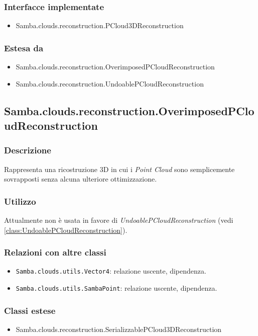 \subsubsection{Interfacce implementate}
\begin{itemize}
	\item Samba.clouds.reconstruction.PCloud3DReconstruction
\end{itemize}
\subsubsection{Estesa da}
\begin{itemize}
	\item Samba.clouds.reconstruction.OverimposedPCloudReconstruction
	\item Samba.clouds.reconstruction.UndoablePCloudReconstruction
\end{itemize}

\subsection{Samba.clouds.reconstruction.OverimposedPCloudReconstruction}
\subsubsection{Descrizione}
Rappresenta una ricostruzione 3D in cui i \emph{Point Cloud} sono semplicemente sovrapposti senza alcuna ulteriore ottimizzazione.
\subsubsection{Utilizzo}
Attualmente non è usata in favore di \emph{UndoablePCloudReconstruction} (vedi \ref{class:UndoablePCloudReconstruction}).
\subsubsection{Relazioni con altre classi}
\begin{itemize}
	\item \texttt{Samba.clouds.utils.Vector4}: relazione uscente, dipendenza.
	\item \texttt{Samba.clouds.utils.SambaPoint}: relazione uscente, dipendenza.
\end{itemize}
\subsubsection{Classi estese}
\begin{itemize}
	\item Samba.clouds.reconstruction.SerializzablePCloud3DReconstruction
\end{itemize}

